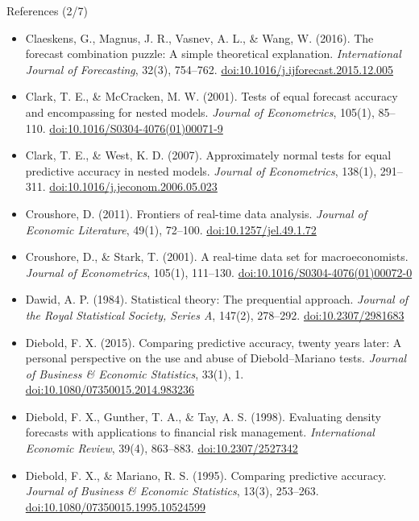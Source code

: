 \begin{frame}{References (2/7)}
\itemsize{\tiny}
\begin{itemize}
    \item Claeskens, G., Magnus, J. R., Vasnev, A. L., \& Wang, W. (2016). The forecast combination puzzle: A simple theoretical explanation. \textit{International Journal of Forecasting}, 32(3), 754--762. \href{https://doi.org/10.1016/j.ijforecast.2015.12.005}{doi:10.1016/j.ijforecast.2015.12.005}
    \item Clark, T. E., \& McCracken, M. W. (2001). Tests of equal forecast accuracy and encompassing for nested models. \textit{Journal of Econometrics}, 105(1), 85--110. \href{https://doi.org/10.1016/S0304-4076(01)00071-9}{doi:10.1016/S0304-4076(01)00071-9}
    \item Clark, T. E., \& West, K. D. (2007). Approximately normal tests for equal predictive accuracy in nested models. \textit{Journal of Econometrics}, 138(1), 291--311. \href{https://doi.org/10.1016/j.jeconom.2006.05.023}{doi:10.1016/j.jeconom.2006.05.023}
    \item Croushore, D. (2011). Frontiers of real-time data analysis. \textit{Journal of Economic Literature}, 49(1), 72--100. \href{https://doi.org/10.1257/jel.49.1.72}{doi:10.1257/jel.49.1.72}
    \item Croushore, D., \& Stark, T. (2001). A real-time data set for macroeconomists. \textit{Journal of Econometrics}, 105(1), 111--130. \href{https://doi.org/10.1016/S0304-4076(01)00072-0}{doi:10.1016/S0304-4076(01)00072-0}
    \item Dawid, A. P. (1984). Statistical theory: The prequential approach. \textit{Journal of the Royal Statistical Society, Series A}, 147(2), 278--292. \href{https://doi.org/10.2307/2981683}{doi:10.2307/2981683}
    \item Diebold, F. X. (2015). Comparing predictive accuracy, twenty years later: A personal perspective on the use and abuse of Diebold--Mariano tests. \textit{Journal of Business \& Economic Statistics}, 33(1), 1. \href{https://doi.org/10.1080/07350015.2014.983236}{doi:10.1080/07350015.2014.983236}
    \item Diebold, F. X., Gunther, T. A., \& Tay, A. S. (1998). Evaluating density forecasts with applications to financial risk management. \textit{International Economic Review}, 39(4), 863--883. \href{https://doi.org/10.2307/2527342}{doi:10.2307/2527342}
    \item Diebold, F. X., \& Mariano, R. S. (1995). Comparing predictive accuracy. \textit{Journal of Business \& Economic Statistics}, 13(3), 253--263. \href{https://doi.org/10.1080/07350015.1995.10524599}{doi:10.1080/07350015.1995.10524599}

\end{itemize}
\end{frame}
